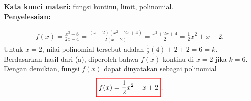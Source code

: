 \documentclass[10pt,openany,a4paper]{article}
\theoremstyle{definition}
\theoremstyle{definition}
\theoremstyle{plain}
\newenvironment{jawab}[2][tes]{%
\par\noindent\textbf{Kata kunci materi:} #1.\\
\textbf{Penyelesaian:} #2%
}{}
\begin{document}
\begin{enumerate}
\begin{jawab}[fungsi kontinu, limit, polinomial]
{\begin{enumerate}
        \begin{align*}
            f(x) = \frac{x^3 - 8}{2x - 4} = \frac{(x-2)(x^2 + 2x + 4)}{2(x-2)} = \frac{x^2 + 2x + 4}{2} = \frac{1}{2}x^2 + x + 2.
        \end{align*}
        Untuk $x=2$, nilai polinomial tersebut adalah $\frac{1}{2}(4)+2+2=6=k$. Berdasarkan hasil dari (a), diperoleh bahwa \(f(x)\) kontinu di \(x=2\) jika \(k=6\). Dengan demikian, fungsi \(f(x)\) dapat dinyatakan sebagai polinomial
        \begin{align*}
            \colorlet{oldcolor}{.}
        \color{red}
        \setlength{\fboxrule}{1pt} \boxed{\color{oldcolor}f(x) = \frac{1}{2}x^2 + x + 2}\color{oldcolor}.
        \end{align*}
        \end{enumerate}
    }
    \end{jawab}


\end{enumerate}
\end{document}
